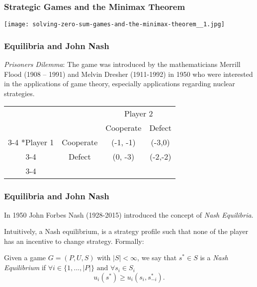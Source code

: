 \documentclass{beamer}
\begin{document}
\begin{frame}
  
  \frametitle{Strategic Games and the Minimax Theorem}
\begin{center}
  \texttt{[image: solving-zero-sum-games-and-the-minimax-theorem\_\_1.jpg]}
\end{center}
\end{frame}


\begin{frame}
  
  \frametitle{Equilibria and John Nash}

  
\emph{Prisoners Dilemma}: The game was introduced
by the mathematicians Merrill Flood (1908 – 1991) and Melvin Dresher
(1911-1992) in 1950 who were interested in the applications of game
theory, especially applications regarding nuclear
strategies.

\begin{table}[h!]
  \centering
  \setlength{\extrarowheight}{2pt}
  \begin{tabular}{cc|c|c|}
    & \multicolumn{1}{c}{} & \multicolumn{2}{c}{Player 2}\\
    & \multicolumn{1}{c}{} & \multicolumn{1}{c}{Cooperate}  &
                                                              \multicolumn{1}{c}{Defect}
    \\\cline{3-4}
    \multirow{2}*{Player 1}  & Cooperate & (-1, -1) &
                                                                   (-3,0) \\\cline{3-4}
    & Defect & (0, -3) & (-2,-2) \\\cline{3-4}
  \end{tabular}
\end{table}


\end{frame}


\begin{frame}
  
\frametitle{Equilibria and John Nash}


In 1950 John Forbes Nash (1928-2015) introduced the concept of
  \emph{Nash Equilibria}.

Intuitively, a Nash equilibrium, is a
strategy profile such that none of the player has an incentive to
change strategy. Formally:

\begin{definition}
  Given a game $G = (P,U,S)$ with $|S| < \infty$, we say that $s^* \in S$ is a
  \emph{Nash Equilibrium} if $\forall i \in
  \{1,...,|P|\} \text{ and }\forall s_i \in S_i$ $$ u_i(s^*) \geq u_i(s_i,s_{-i}^*).$$ 
\end{definition}


\end{frame}
\end{document}

